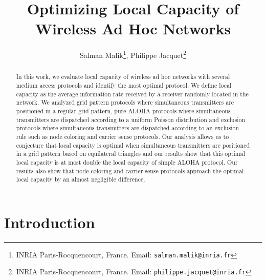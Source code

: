 \documentclass[12pt,english]{article}
\begin{document}
\def\ss{\sigma}
\def\fpzi{\frac{\partial}{\partial z_i}}
\def\fpzj{\frac{\partial}{\partial z_j}}
\def\BM{{\bf M}}
\def\BI{{\bf I}}
\def\BA{{\bf A}}
\def\BB{{\bf B}}
\def\E{{\bf E}}
\def\BD{{\bf D}}
\def\BT{{\bf T}}
\def\BX{{\bf X}}
\def\BU{{\bf U}}
\def\Bu{{\bf u}}
\def\BV{{\bf V}}
\def\Bv{{\bf v}}
\def\BI{\hbox{I}}
\def\BJ{\hbox{J}}
\def\det{\hbox{\rm det}}
\def\tr{\hbox{\rm tr}}
\def\fpx{\frac{\partial}{\partial x}}
\def\fpy{\frac{\partial}{\partial y}}
\def\det{\hbox{\rm det}}

\title{Optimizing Local Capacity of Wireless Ad Hoc Networks}

\author{
Salman Malik\footnote{INRIA Paris-Rocquencourt, France. Email: \texttt{salman.malik@inria.fr}}, 
Philippe Jacquet\footnote{INRIA Paris-Rocquencourt, France. Email: \texttt{philippe.jacquet@inria.fr}}
}
\date{}

\maketitle

\begin{abstract}

In this work, we evaluate local capacity of wireless ad hoc networks with several medium access protocols and identify the most optimal protocol. We define local capacity as the average information rate received by a receiver randomly located in the network. We analyzed grid pattern protocols where simultaneous transmitters are positioned in a regular grid pattern, pure ALOHA protocols where simultaneous transmitters are dispatched according to a uniform Poisson distribution and exclusion protocols where simultaneous transmitters are dispatched according to an exclusion rule such as node coloring and carrier sense protocols. Our analysis allows us to conjecture that local capacity is optimal when simultaneous transmitters are positioned in a grid pattern based on equilateral triangles and our results show that this optimal local capacity is at most double the local capacity of simple ALOHA protocol. Our results also show that node coloring and carrier sense protocols approach the optimal local capacity by an almost negligible difference. 

\end{abstract}

\section{Introduction}
\label{sec:intro}
\end{document}
